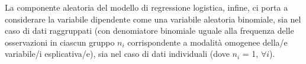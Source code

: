 La componente aleatoria del modello di regressione logistica, infine, ci porta a considerare la variabile dipendente come una variabile aleatoria binomiale, sia nel caso di dati raggruppati (con denomiatore binomiale uguale alla frequenza delle osservazioni in ciascun gruppo $n_i$ corrispondente a modalità omogenee della/e variabile/i esplicativa/e), sia nel caso di dati individuali (dove $n_i$ = 1, $\forall i$).

